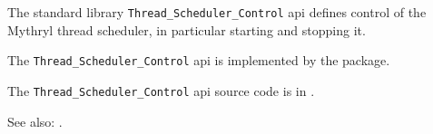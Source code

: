 
The standard library {\tt Thread\_Scheduler\_Control} api defines 
control of the Mythryl thread scheduler, in particular starting and stopping it.

The {\tt Thread\_Scheduler\_Control} api is implemented by the  package.

The {\tt Thread\_Scheduler\_Control} api source code is in .

See also: .






